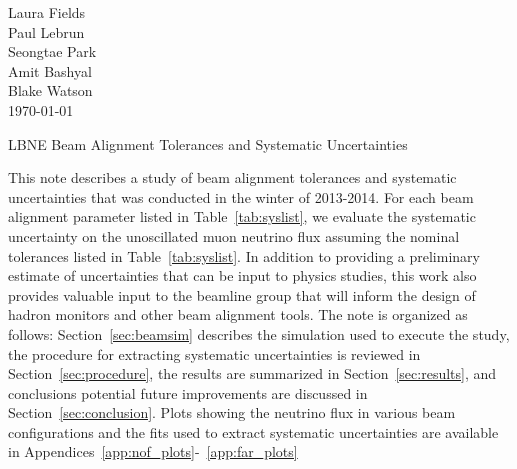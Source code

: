 



\begin{flushright}
Laura Fields\\
Paul Lebrun \\
Seongtae Park \\
Amit Bashyal \\
Blake Watson \\
\today
\end{flushright}

\begin{center}

{\LARGE LBNE Beam Alignment Tolerances and Systematic Uncertainties}
\end{center}




This note describes a study of beam alignment tolerances and systematic uncertainties that was conducted in the winter of 2013-2014.  For each beam alignment parameter listed in Table~\ref{tab:syslist}, we evaluate the systematic uncertainty on the unoscillated muon neutrino flux assuming the nominal tolerances listed in Table~\ref{tab:syslist}.  In addition to providing a preliminary estimate of uncertainties that can be input to physics studies, this work also provides valuable input to the beamline group that will inform the design of hadron monitors and other beam alignment tools.  The note is organized as follows: Section~\ref{sec:beamsim} describes the simulation used to execute the study, the procedure for extracting systematic uncertainties is reviewed in Section~\ref{sec:procedure}, the results are summarized in Section~\ref{sec:results}, and conclusions potential future improvements are discussed in Section~\ref{sec:conclusion}.  Plots showing the neutrino flux in various beam configurations and the fits used to extract systematic uncertainties are available in Appendices~\ref{app:nof_plots}-~\ref{app:far_plots}

